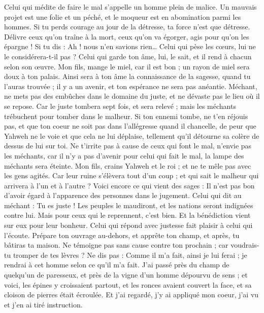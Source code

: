 \begin{multicols}{2}
Celui qui médite de faire le mal s’appelle un homme plein de malice.
Un mauvais projet est une folie et un péché, et le moqueur est en abomination parmi les hommes.
Si tu perds courage au jour de la détresse, ta force n'est que détresse.
Délivre ceux qu’on traîne à la mort, ceux qu’on va égorger, agis pour qu’on les épargne !
Si tu dis : Ah ! nous n’en savions rien… Celui qui pèse les cœurs, lui ne le considérera-t-il pas ? Celui qui garde ton âme, lui, le sait, et il rend à chacun selon son œuvre.
Mon fils, mange le miel, car il est bon ; un rayon de miel sera doux à ton palais.
Ainsi sera à ton âme la connaissance de la sagesse, quand tu l'auras trouvée ; il y a un avenir, et ton espérance ne sera pas anéantie.
Méchant, ne mets pas des embûches dans le domaine du juste, et ne dévaste pas le lieu où il se repose.
Car le juste tombera sept fois, et sera relevé ; mais les méchants trébuchent pour tomber dans le malheur.
Si ton ennemi tombe, ne t'en réjouis pas, et que ton coeur ne soit pas dans l’allégresse quand il chancelle,
de peur que Yahweh ne le voie et que cela ne lui déplaise, tellement qu'il détourne sa colère de dessus de lui sur toi.
Ne t’irrite pas à cause de ceux qui font le mal, n'envie pas les méchants,
car il n'y a pas d’avenir pour celui qui fait le mal, la lampe des méchants sera éteinte.
Mon fils, crains Yahweh et le roi ; et ne te mêle pas avec les gens agités.
Car leur ruine s'élèvera tout d'un coup ; et qui sait le malheur qui arrivera à l’un et à l’autre ?
Voici encore ce qui vient des sages : Il n'est pas bon d'avoir égard à l'apparence des personnes dans le jugement.
Celui qui dit au méchant : Tu es juste ! Les peuples le maudiront, et les nations seront indignées contre lui.
Mais pour ceux qui le reprennent, c’est bien. Et la bénédiction vient sur eux pour leur bonheur.
Celui qui répond avec justesse fait plaisir à celui qui l'écoute.
Prépare ton ouvrage au-dehors, et apprête ton champ, et après, tu bâtiras ta maison.
Ne témoigne pas sans cause contre ton prochain ; car voudrais-tu tromper de tes lèvres ?
Ne dis pas : Comme il m'a fait, ainsi je lui ferai ; je rendrai à cet homme selon ce qu'il m'a fait.
J'ai passé près du champ de quelqu’un de paresseux, et près de la vigne d'un homme dépourvu de sens ;
et voici, les épines y croissaient partout, et les ronces avaient couvert la face, et sa cloison de pierres était écroulée.
Et j’ai regardé, j’y ai appliqué mon coeur, j’ai vu et j’en ai tiré instruction.

\end{multicols}

